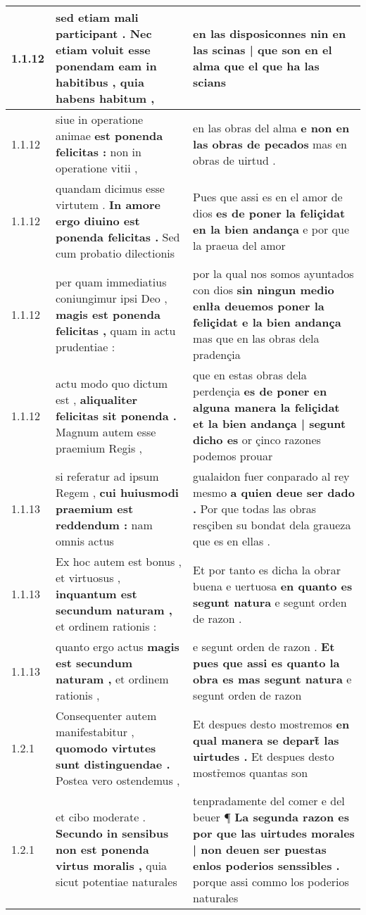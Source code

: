 \begin{tabular}{|p{1cm}|p{6.5cm}|p{6.5cm}|}
1.1.12 & sed etiam mali participant . \textbf{ Nec etiam voluit esse ponendam eam in habitibus , } quia habens habitum , & en las disposiconnes \textbf{ nin en las scinas | que son en el alma } que el que ha las scians \\\hline
1.1.12 & siue in operatione animae \textbf{ est ponenda felicitas : } non in operatione vitii , & en las obras del alma \textbf{ e non en las obras de pecados } mas en obras de uirtud . \\\hline
1.1.12 & quandam dicimus esse virtutem . \textbf{ In amore ergo diuino est ponenda felicitas . } Sed cum probatio dilectionis & Pues que assi es en el amor de dios \textbf{ es de poner la feliçidat en la bien andança } e por que la praeua del amor \\\hline
1.1.12 & per quam immediatius coniungimur ipsi Deo , \textbf{ magis est ponenda felicitas , } quam in actu prudentiae : & por la qual nos somos ayuntados con dios \textbf{ sin ningun medio enlła deuemos poner la feliçidat e la bien andança } mas que en las obras dela pradençia \\\hline
1.1.12 & actu modo quo dictum est , \textbf{ aliqualiter felicitas sit ponenda . } Magnum autem esse praemium Regis , & que en estas obras dela perdençia \textbf{ es de poner en alguna manera la feliçidat et la bien andança | segunt dicho es } or çinco razones podemos prouar \\\hline
1.1.13 & si referatur ad ipsum Regem , \textbf{ cui huiusmodi praemium est reddendum : } nam omnis actus & gualaidon fuer conparado al rey mesmo \textbf{ a quien deue ser dado . } Por que todas las obras resçiben su bondat dela graueza que es en ellas . \\\hline
1.1.13 & Ex hoc autem est bonus , et virtuosus , \textbf{ inquantum est secundum naturam , } et ordinem rationis : & Et por tanto es dicha la obrar buena e uertuosa \textbf{ en quanto es segunt natura } e segunt orden de razon . \\\hline
1.1.13 & quanto ergo actus \textbf{ magis est secundum naturam , } et ordinem rationis , & e segunt orden de razon . \textbf{ Et pues que assi es quanto la obra es mas segunt natura } e segunt orden de razon \\\hline
1.2.1 & Consequenter autem manifestabitur , \textbf{ quomodo virtutes sunt distinguendae . } Postea vero ostendemus , & Et despues desto mostremos \textbf{ en qual manera se depart̃ las uirtudes . } Et despues desto mostr̉emos quantas son \\\hline
1.2.1 & et cibo moderate . \textbf{ Secundo in sensibus non est ponenda virtus moralis , } quia sicut potentiae naturales & tenpradamente del comer e del beuer ¶ \textbf{ La segunda razon es por que las uirtudes morales | non deuen ser puestas enlos poderios senssibles . } porque assi commo los poderios naturales \\\hline

\end{tabular}
